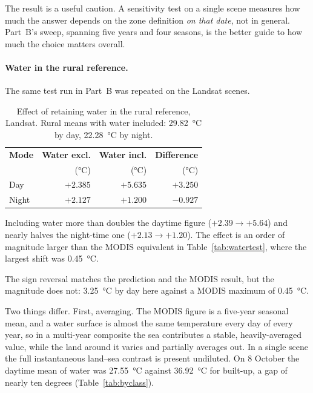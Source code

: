 \documentclass[11pt,a4paper]{article}
\begin{document}
The result is a useful caution. A sensitivity test on a single scene
measures how much the answer depends on the zone definition
\emph{on that date}, not in general. Part~B's sweep, spanning five
years and four seasons, is the better guide to how much the choice
matters overall.

\paragraph{Water in the rural reference.}
The same test run in Part~B was repeated on the Landsat scenes.

\begin{table}[htbp]
\centering
\begin{tabular}{lrrr}
\toprule
\textbf{Mode} & \textbf{Water excl.} & \textbf{Water incl.} &
\textbf{Difference} \\
 & (\si{\degreeCelsius}) & (\si{\degreeCelsius}) &
(\si{\degreeCelsius}) \\
\midrule
Day   & $+2.385$ & $+5.635$ & $+3.250$ \\
Night & $+2.127$ & $+1.200$ & $-0.927$ \\
\bottomrule
\end{tabular}
\caption{Effect of retaining water in the rural reference, Landsat.
Rural means with water included: \SI{29.82}{\degreeCelsius} by day,
\SI{22.28}{\degreeCelsius} by night.}
\label{tab:landsat_water}
\end{table}

Including water more than doubles the daytime figure
($+2.39 \rightarrow +5.64$) and nearly halves the night-time one
($+2.13 \rightarrow +1.20$). The effect is an order of magnitude
larger than the MODIS equivalent in Table~\ref{tab:watertest}, where
the largest shift was \SI{0.45}{\degreeCelsius}.

The
sign reversal matches the prediction and the MODIS result, but the
magnitude does not: \SI{3.25}{\degreeCelsius} by day here against a
MODIS maximum of \SI{0.45}{\degreeCelsius}.

Two things differ. First, averaging. The MODIS figure is a five-year
seasonal mean, and a water surface is almost the same temperature
every day of every year, so in a multi-year composite the sea
contributes a stable, heavily-averaged value, while the land around it
varies and partially averages out. In a single scene the full
instantaneous land--sea contrast is present undiluted. On 8 October
the daytime mean of water was \SI{27.55}{\degreeCelsius} against
\SI{36.92}{\degreeCelsius} for built-up, a gap of nearly ten degrees
(Table~\ref{tab:byclass}).
\end{document}
